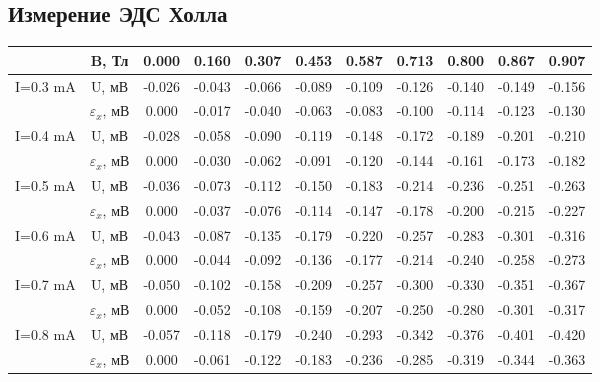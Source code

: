 \documentclass[a4paper, 12pt]{article}%
\begin{document}
	\subsection*{Измерение ЭДС Холла}
	\begin{table}[H]
		\centering
		\begin{tabular}{|c|c|c|c|c|c|c|c|c|c|c|}
			\hline
			\multicolumn{1}{|l|}{}    & B, Тл               & 0.000  & 0.160  & 0.307  & 0.453  & 0.587  & 0.713  & 0.800  & 0.867  & 0.907  \\ \hline
			\multirow{2}{*}{I=0.3 mA}  & U, мВ               & -0.026 & -0.043 & -0.066 & -0.089 & -0.109 & -0.126 & -0.140 & -0.149 & -0.156 \\ \cline{2-11} 
			& $\varepsilon_x$, мВ & 0.000  & -0.017 & -0.040 & -0.063 & -0.083 & -0.100 & -0.114 & -0.123 & -0.130 \\ \hline
			\multirow{2}{*}{I=0.4 mA}  & U, мВ               & -0.028 & -0.058 & -0.090 & -0.119 & -0.148 & -0.172 & -0.189 & -0.201 & -0.210 \\ \cline{2-11} 
			& $\varepsilon_x$, мВ & 0.000  & -0.030 & -0.062 & -0.091 & -0.120 & -0.144 & -0.161 & -0.173 & -0.182 \\ \hline
			\multirow{2}{*}{I=0.5 mA}  & U, мВ               & -0.036 & -0.073 & -0.112 & -0.150 & -0.183 & -0.214 & -0.236 & -0.251 & -0.263 \\ \cline{2-11} 
			& $\varepsilon_x$, мВ & 0.000  & -0.037 & -0.076 & -0.114 & -0.147 & -0.178 & -0.200 & -0.215 & -0.227 \\ \hline
			\multirow{2}{*}{I=0.6 mA}  & U, мВ               & -0.043 & -0.087 & -0.135 & -0.179 & -0.220 & -0.257 & -0.283 & -0.301 & -0.316 \\ \cline{2-11} 
			& $\varepsilon_x$, мВ & 0.000  & -0.044 & -0.092 & -0.136 & -0.177 & -0.214 & -0.240 & -0.258 & -0.273 \\ \hline
			\multirow{2}{*}{I=0.7 mA}  & U, мВ               & -0.050 & -0.102 & -0.158 & -0.209 & -0.257 & -0.300 & -0.330 & -0.351 & -0.367 \\ \cline{2-11} 
			& $\varepsilon_x$, мВ & 0.000  & -0.052 & -0.108 & -0.159 & -0.207 & -0.250 & -0.280 & -0.301 & -0.317 \\ \hline
			\multirow{2}{*}{I=0.8 mA}  & U, мВ               & -0.057 & -0.118 & -0.179 & -0.240 & -0.293 & -0.342 & -0.376 & -0.401 & -0.420 \\ \cline{2-11} 
			& $\varepsilon_x$, мВ & 0.000  & -0.061 & -0.122 & -0.183 & -0.236 & -0.285 & -0.319 & -0.344 & -0.363 \\ \hline

\end{tabular}
\end{table}
\end{document}
